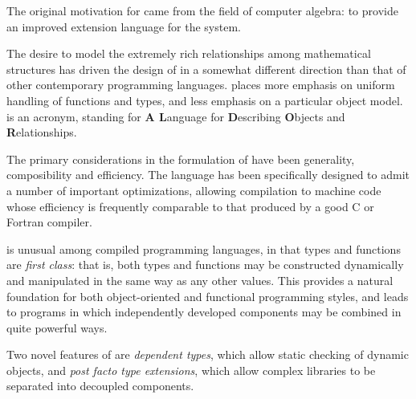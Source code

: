 

The original motivation for \asharpfull{} came from the field of
computer algebra:
to provide an improved extension language for the \axiom{} system.

The desire to model the extremely rich relationships among
mathematical structures has driven the design of \asharp{} in a
somewhat different direction than that of other contemporary programming
languages.  \asharp{} places more emphasis on uniform handling of
functions and types, and less emphasis on a particular object model.
\asharp{} is an acronym, standing for {\bf A L}anguage for {\bf D}escribing
{\bf O}bjects and {\bf R}elationships.

The primary considerations in the formulation of \asharp{} have been
generality, composibility and efficiency.
The \asharp{} language has been specifically designed to admit a number
of important optimizations, allowing compilation to machine code whose
efficiency is frequently comparable to that produced by a good C
or Fortran compiler.

\asharp{} is unusual among compiled programming languages, in that
types and functions are {\em first class}:
that is, both types and functions may be
constructed dynamically and manipulated
in the same way as any other values.
This provides a natural foundation for both object-oriented and functional
programming styles, and leads to programs
in which independently developed components may be combined
in quite powerful ways.

Two novel features of \asharp{} are {\em dependent types\/},
which allow static checking of dynamic objects, 
and {\em post facto type extensions}, which allow complex libraries
to be separated into decoupled components.

